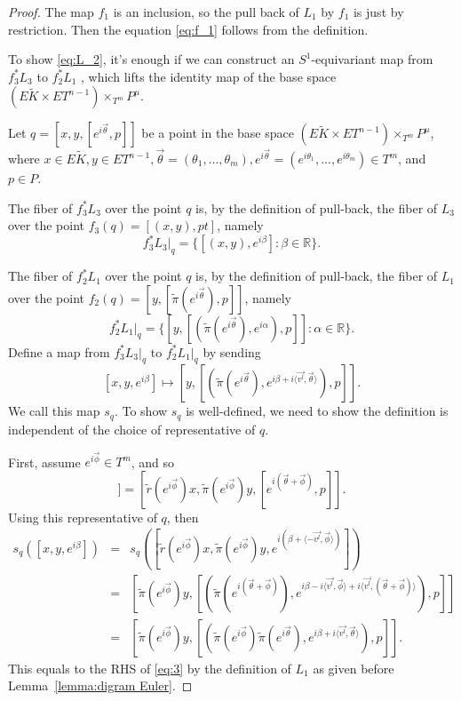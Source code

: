\documentclass[12pt]{amsart}
\def\R {{\mathbb{R}}}
\theoremstyle{definition}
\numberwithin{equation}{section}
\begin{document}
\begin{proof}
The map $f_{1}$ is an inclusion, so the pull back of $L_{1}$ by
$f_{1}$ is just by restriction. Then the equation \eqref{eq:f_1}
follows from the definition.

To show \eqref{eq:L_2}, it's enough if we can construct an
$S^1$-equivariant map from $f_{3}^{*}L_{3}$ to $f_{2}^{*}L_{1}$ ,
which lifts the identity map of the base space $(E\tilde{K}\times
ET^{n-1})\times_{T^m}P^{\mu}$.

Let $q= [x,y,[e^{i\vec{\theta}},p]]$ be a point in the base space
$(E\tilde{K}\times ET^{n-1})\times_{T^m}P^{\mu}$, where $x\in
E\tilde{K}, y\in ET^{n-1}, \vec{\theta}=(\theta_{1},...,\theta_{m}),
e^{i\vec{\theta}}=(e^{i\theta_{1}},...,e^{i\theta_{m}})\in T^m$, and
$p\in P$.

The fiber of $f_{3}^{*}L_{3}$ over the point $q$ is, by the
definition of pull-back, the fiber of $L_{3}$ over the point
$f_{3}(q)=[(x,y),pt]$, namely
\begin{equation}\label{eq:1}
f_{3}^{*}L_{3}|_{q}=\{[(x,y), e^{i\beta}]:\beta\in \R\}.
\end{equation}

 The fiber of
$f_{2}^{*}L_{1}$ over the point $q$ is, by the definition of
pull-back, the fiber of $L_{1}$ over the point $f_{2}(q)=[y,[
\tilde{\pi}(e^{i\vec{\theta}}),p]]$, namely
\begin{equation}\label{eq:2}
f_{2}^{*}L_{1}|_{q}=\{[y,[(\tilde{\pi}(e^{i\vec{\theta}}),e^{i\alpha}),p]]:
\alpha\in \R\}.
\end{equation}
Define a map from $f_{3}^{*}L_{3}|_{q}$ to $f_{2}^{*}L_{1}|_{q}$ by
sending
\begin{equation}\label{eq:3}
[x,y, e^{i\beta}]\mapsto
[y,[(\tilde{\pi}(e^{i\vec{\theta}}),e^{i\beta+i\langle
\vec{v^{l}},\vec{\theta}\rangle}),p]].
\end{equation}
We call this map $s_{q}$. To show $s_{q}$ is well-defined, we need
to show the definition is independent of the choice of
representative of $q$.

First, assume $e^{i\vec{\phi}}\in T^m$, and so
\begin{equation}
[x,y,[e^{i\vec{\theta}},p]]=[\tilde{r}(e^{i\vec{\phi}})x,\tilde{\pi}(e^{i\vec{\phi}})y,[e^{i(\vec{\theta}+\vec{\phi})},p]].
\end{equation}
Using this representative of $q$, then
\begin{eqnarray*}\label{eq:4}
s_{q}([x,y,e^{i\beta}])& = &
s_{q}([\tilde{r}(e^{i\vec{\phi}})x,\tilde{\pi}(e^{i\vec{\phi}})y,
e^{i(\beta+\langle -\vec{v^{l}},\vec{\phi}\rangle)}])\\
& = &
[\tilde{\pi}(e^{i\vec{\phi}})y,[(\tilde{\pi}(e^{i(\vec{\theta}+\vec{\phi})}),e^{i\beta-i\langle
\vec{v^{l}},\vec{\phi}\rangle
+i\langle\vec{v^{l}},(\vec{\theta}+\vec{\phi}) \rangle}),p]]\\
& = &
[\tilde{\pi}(e^{i\vec{\phi}})y,[(\tilde{\pi}(e^{i\vec{\phi}})\tilde{\pi}(e^{i\vec{\theta}}),e^{i\beta+i\langle
 \vec{v^{l}},\vec{\theta}\rangle}),p]].
\end{eqnarray*}
This equals to the
 RHS of \eqref{eq:3}
by the definition of $L_{1}$ as given before Lemma~\ref{lemma:digram
Euler}.


\end{proof}
\end{document}
